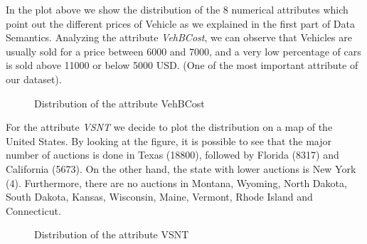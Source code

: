 \documentclass{article}
\begin{document}
In the plot above we show the distribution of the 8 numerical attributes which point out the different prices of Vehicle as we explained in the first part of Data Semantics.  
    Analyzing the attribute \emph{VehBCost}, we can observe that Vehicles are usually sold for a price between 6000 and 7000, and a very low percentage of cars is sold above 11000 or below 5000 USD. (One of the most important attribute of our dataset).

 \begin{figure}[H]
	\centering
	\caption{{ Distribution of the attribute VehBCost}}
\end{figure}


For the attribute \emph{VSNT} we decide to plot the distribution on a map of the United States. By looking at the figure, it is possible to see that the major number of auctions is done in Texas (18800), followed by Florida (8317) and California (5673). On the other hand, the state with lower auctions is New York (4). Furthermore, there are no auctions in Montana, Wyoming, North Dakota, South Dakota, Kansas, Wisconsin, Maine, Vermont, Rhode Island and Connecticut. \\

\begin{figure}[H]
	\centering
	\caption{{ Distribution of the attribute VSNT}}
\end{figure}
\end{document}
